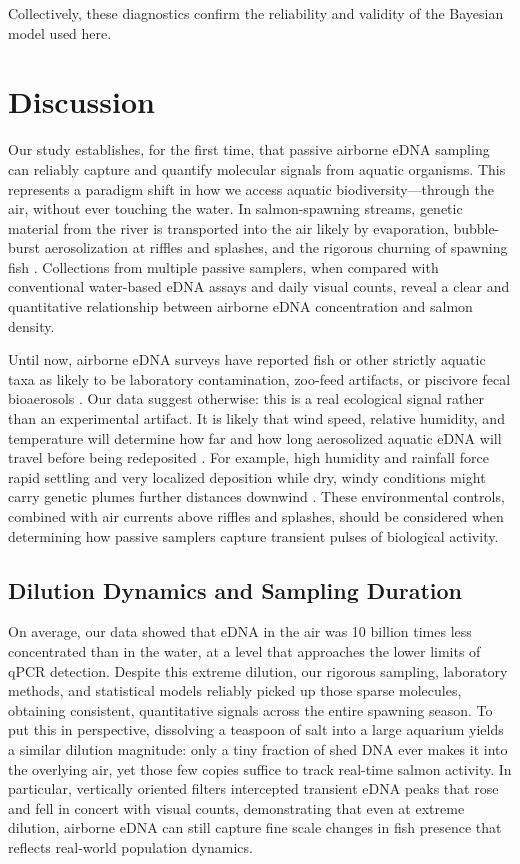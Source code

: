 \documentclass{article}
\begin{document}
Collectively, these diagnostics confirm the reliability and validity of the Bayesian model used here.


\section{Discussion}
Our study establishes, for the first time, that passive airborne eDNA sampling can reliably capture and quantify molecular signals from aquatic organisms. This represents a paradigm shift in how we access aquatic biodiversity—through the air, without ever touching the water. In salmon-spawning streams, genetic material from the river is transported into the air likely by evaporation, bubble-burst aerosolization at riffles and splashes, and the rigorous churning of spawning fish \cite{wood2021,prather2013}. Collections from multiple passive samplers, when compared with conventional water-based eDNA assays and daily visual counts, reveal a clear and quantitative relationship between airborne eDNA concentration and salmon density. 

Until now, airborne eDNA surveys have reported fish or other strictly aquatic taxa as likely to be laboratory contamination, zoo-feed artifacts, or piscivore fecal bioaerosols \cite{klepke2022,lynggaard2023, sullivan2023,lynggaard2022}. Our data suggest otherwise: this is a real ecological signal rather than an experimental artifact. It is likely that wind speed, relative humidity, and temperature will determine how far and how long aerosolized aquatic eDNA will travel before being redeposited \cite{abrego2024,giolai2024}. For example, high humidity and rainfall force rapid settling and very localized deposition while dry, windy conditions might carry genetic plumes further distances downwind \cite{galban2021,maki2023}. These environmental controls, combined with air currents above riffles and splashes, should be considered when determining how passive samplers capture transient pulses of biological activity.

\subsection{Dilution Dynamics and Sampling Duration}
On average, our data showed that eDNA in the air was 10 billion times less concentrated than in the water, at a level that approaches the lower limits of qPCR detection. Despite this extreme dilution, our rigorous sampling, laboratory methods, and statistical models reliably picked up those sparse molecules, obtaining consistent, quantitative signals across the entire spawning season. To put this in perspective, dissolving a teaspoon of salt into a large aquarium yields a similar dilution magnitude: only a tiny fraction of shed DNA ever makes it into the overlying air, yet those few copies suffice to track real-time salmon activity. In particular, vertically oriented filters intercepted transient eDNA peaks that rose and fell in concert with visual counts, demonstrating that even at extreme dilution, airborne eDNA can still capture fine scale changes in fish presence that reflects real-world population dynamics.
\end{document}
